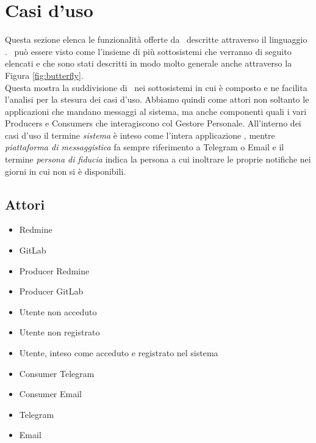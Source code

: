 \clearpage
\section{Casi d'uso}\label{CasiDUso}
Questa sezione elenca le funzionalità offerte da \progetto\ descritte attraverso il linguaggio .
\progetto\ può essere visto come l'insieme di più sottosistemi che verranno di seguito elencati e che sono stati descritti in modo molto generale anche attraverso la Figura \ref{fig:butterfly}.\\
Questa mostra la suddivisione di \progetto\ nei sottosistemi in cui è composto e ne facilita l'analisi per la stesura dei casi d'uso.
Abbiamo quindi come attori non soltanto le applicazioni che mandano messaggi al sistema, ma anche componenti quali i vari Producers e Consumers che interagiscono col Gestore Personale.
All'interno dei casi d'uso il termine \textit{sistema} è inteso come l'intera applicazione \progetto, mentre \textit{piattaforma di messaggistica} fa sempre riferimento a Telegram o Email e il termine \textit{persona di fiducia} indica la persona a cui inoltrare le proprie notifiche nei giorni in cui non si è disponibili.
	
	\subsection{Attori}
	\begin{itemize}
		\item Redmine
		\item GitLab
		\item Producer Redmine
		\item Producer GitLab
		\item Utente non acceduto
		\item Utente non registrato
		\item Utente, inteso come acceduto e registrato nel sistema
		\item Consumer Telegram
		\item Consumer Email
		\item Telegram
		\item Email
	\end{itemize}

